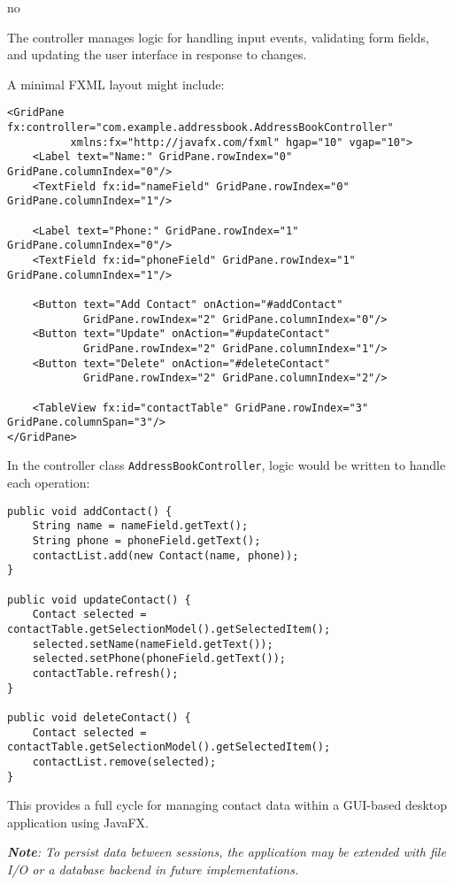 no\documentclass{article}
\newcommand{\codecmd}[1]{\textcolor[rgb]{0,0.5,0}{\texttt{#1}}}
\begin{document}
The controller manages logic for handling input events, validating form fields, and updating the user interface in response to changes.

A minimal FXML layout might include:

\begin{verbatim}
<GridPane fx:controller="com.example.addressbook.AddressBookController"
          xmlns:fx="http://javafx.com/fxml" hgap="10" vgap="10">
    <Label text="Name:" GridPane.rowIndex="0" GridPane.columnIndex="0"/>
    <TextField fx:id="nameField" GridPane.rowIndex="0" GridPane.columnIndex="1"/>

    <Label text="Phone:" GridPane.rowIndex="1" GridPane.columnIndex="0"/>
    <TextField fx:id="phoneField" GridPane.rowIndex="1" GridPane.columnIndex="1"/>

    <Button text="Add Contact" onAction="#addContact"
            GridPane.rowIndex="2" GridPane.columnIndex="0"/>
    <Button text="Update" onAction="#updateContact"
            GridPane.rowIndex="2" GridPane.columnIndex="1"/>
    <Button text="Delete" onAction="#deleteContact"
            GridPane.rowIndex="2" GridPane.columnIndex="2"/>

    <TableView fx:id="contactTable" GridPane.rowIndex="3" GridPane.columnSpan="3"/>
</GridPane>
\end{verbatim}

In the controller class \codecmd{AddressBookController}, logic would be written to handle each operation:

\begin{verbatim}
public void addContact() {
    String name = nameField.getText();
    String phone = phoneField.getText();
    contactList.add(new Contact(name, phone));
}

public void updateContact() {
    Contact selected = contactTable.getSelectionModel().getSelectedItem();
    selected.setName(nameField.getText());
    selected.setPhone(phoneField.getText());
    contactTable.refresh();
}

public void deleteContact() {
    Contact selected = contactTable.getSelectionModel().getSelectedItem();
    contactList.remove(selected);
}
\end{verbatim}

\noindent This provides a full cycle for managing contact data within a GUI-based desktop application using JavaFX.

\medskip
\textit{\textbf{Note}: To persist data between sessions, the application may be extended with file I/O or a database backend in future implementations.}
\end{document}
